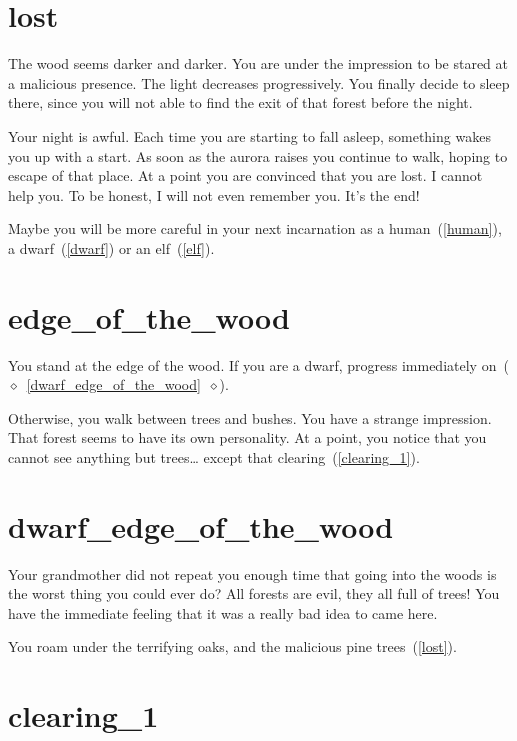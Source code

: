\section{lost}

The wood seems darker and darker. You are under the impression to be stared at a
malicious presence. The light decreases progressively. You finally decide to
sleep there, since you will not able to find the exit of that forest before the
night.

Your night is awful. Each time you are starting to fall asleep, something wakes
you up with a start. As soon as the aurora raises you continue to walk, hoping
to escape of that place. At a point you are convinced that you are lost. I
cannot help you. To be honest, I will not even remember you. It's the end!

\medbreak

Maybe you will be more careful in your next incarnation as a
human~(\ref{human}), a dwarf~(\ref{dwarf}) or an elf~(\ref{elf}).

\section{edge_of_the_wood}

You stand at the edge of the wood. If you are a dwarf, progress immediately
on~($\diamond$~\ref{dwarf_edge_of_the_wood}~$\diamond$).

\medbreak

Otherwise, you walk between trees and bushes. You have a strange impression.
That forest seems to have its own personality. At a point, you notice that you
cannot see anything but trees… except that clearing~(\ref{clearing_1}).

\section{dwarf_edge_of_the_wood}

Your grandmother did not repeat you enough time that going into the woods is
the worst thing you could ever do? All forests are evil, they all full of trees!
You have the immediate feeling that it was a really bad idea to came here.

You roam under the terrifying oaks, and the malicious pine trees~(\ref{lost}).

\section{clearing_1}

